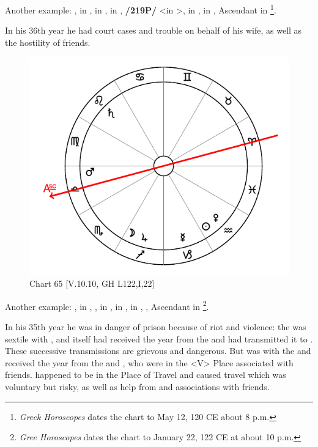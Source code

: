 \noindent Another example: \Sun, \Venus\xspace in \Taurus, \Moon\xspace in \Aries, \Saturn\xspace in \Cancer, \textbf{/219P/} \Jupiter <in \Libra>, \Mars\xspace in \Virgo, \Mercury\xspace in \Gemini, Ascendant in \Sagittarius\footnote{\textit{Greek Horoscopes} dates the chart to May 12, 120 CE about 8 p.m.}. 

In his 36th year he had court cases and trouble on behalf of his wife, as well as the hostility of friends.

\begin{figure}
\centering
\vspace{-20pt}
\includegraphics[width=.68\textwidth]{charts/5_10_10}
\caption{Chart 65 [V.10.10, GH L122,I,22]}
\label{fig:chart65}
\end{figure}

\noindent Another example: \Sun, \Venus\xspace in \Aquarius, \Moon, \Jupiter\xspace in \Sagittarius, \Saturn\xspace in \Leo, \Mercury\xspace in \Capricorn, \Mars, Ascendant in \Libra\footnote{\textit{Gree Horoscopes} dates the chart to January 22, 122 CE at about 10 p.m.}. 

In his 35th year he was in danger of prison because of riot and
violence: the \Moon\xspace was sextile with \Mars, and \Mars\xspace itself had received the year from the \Moon\xspace and had transmitted it to \Saturn. These successive transmissions are grievous and dangerous. But \Jupiter\xspace was with the \Moon\xspace and received the year from the \Sun\xspace and \Venus, who were in the <V> Place associated with friends. \Jupiter\xspace happened to be in the Place of Travel and caused travel which was voluntary but risky, as well as help from and associations with friends.

